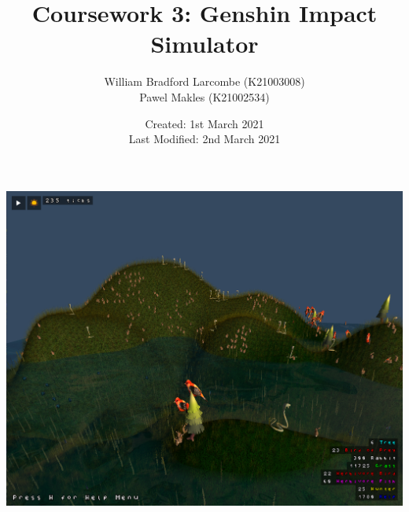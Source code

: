 \documentclass{article}
\title{\Huge Coursework 3: Genshin Impact Simulator}
\author{William Bradford Larcombe \small (K21003008) \\ Pawel Makles \small (K21002534)}
\date{\small Created: 1st March 2021 \\ Last Modified: 2nd March 2021}
\begin{document}
    \maketitle
    \vfill
    \centering \includegraphics[width=\textwidth]{../screenshot.png}
    
    \newpage
\end{document}
